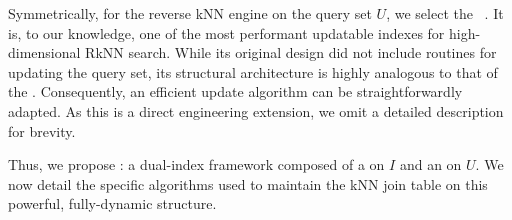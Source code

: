 Symmetrically, for the reverse kNN engine on the query set $U$, we select the \textbf{\hdrtree}~\cite{yang2014continuous}. It is, to our knowledge, one of the most performant updatable indexes for high-dimensional RkNN search. While its original design did not include routines for updating the query set, its structural architecture is highly analogous to that of the \deltatree. Consequently, an efficient update algorithm can be straightforwardly adapted. As this is a direct engineering extension, we omit a detailed description for brevity.

Thus, we propose \dualtree: a dual-index framework composed of a \deltatree on $I$ and an \hdrtree on $U$. We now detail the specific algorithms used to maintain the kNN join table on this powerful, fully-dynamic structure.

